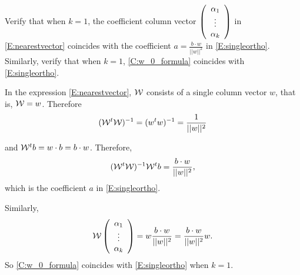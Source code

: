 \documentclass{ximera}
\begin{document}
\begin{exercise} \label{YZ_9.1.6}
Verify that when $k=1$, the coefficient column vector $\left(\begin{array}{cccccccccccc} \alpha_1\\ \vdots\\ \alpha_k \end{array}\right)$ in \eqref{E:nearestvector} coincides with the coefficient $a=\frac{b\cdot w}{||w||^2}$ in \eqref{E:singleortho}. Similarly, verify that when $k=1$, \eqref{C:w_0_formula} coincides with \eqref{E:singleortho}.

\begin{solution}
\soln 
In the expression \eqref{E:nearestvector}, $\mathcal{W}$ consists of a single column vector $w$, 
that is, $\mathcal{W}=w$. Therefore 
\[
(\mathcal{W}^t\mathcal{W})^{-1}=(w^tw)^{-1}=\frac{1}{||w||^2}
\]

and $\mathcal{W}^tb=w\cdot b=b\cdot w$. Therefore, 
\[
(\mathcal{W}^t\mathcal{W})^{-1}\mathcal{W}^tb=\frac{b\cdot w}{||w||^2},
\]
which is the coefficient $a$ in \eqref{E:singleortho}.

Similarly, 
\[
\mathcal{W}\left(\begin{array}{cccccccccccc} \alpha_1\\ \vdots\\ \alpha_k \end{array}\right)=w\frac{b\cdot w}{||w||^2}=\frac{b\cdot w}{||w||^2}w.
\]
So \eqref{C:w_0_formula} coincides with \eqref{E:singleortho} when $k=1$.
\end{solution}
\end{exercise}
\end{document}
